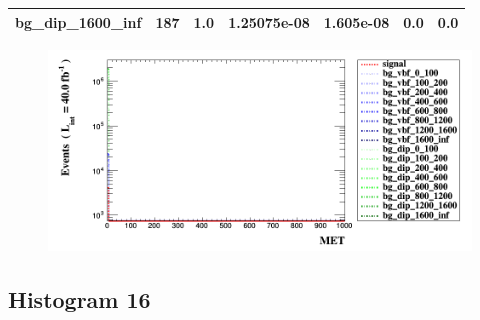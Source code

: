 \documentclass[a4paper, 10pt]{article}
\begin{document}
\begin{table}[H]
\begin{center}
\begin{tabular}{|m{23.0mm}|m{23.0mm}|m{18.0mm}|m{19.0mm}|m{19.0mm}|m{19.0mm}|m{19.0mm}|}
      \hline
      {\cellcolor{white}         bg\_dip\_1600\_inf}& {\cellcolor{white}         187}& {\cellcolor{white}         1.0}& {\cellcolor{white}         1.25075e-08}& {\cellcolor{white}         1.605e-08}& {\cellcolor{green}         0.0}& {\cellcolor{green}         0.0}\\
\hline
    \end{tabular}
  \end{center}
\end{table}

\begin{figure}[H]
  \begin{center}
    \includegraphics[scale=0.45]{selection_14.png}\\
\caption{   }
  \end{center}
\end{figure}
      \newpage
\subsection{ Histogram 16}
\end{document}

